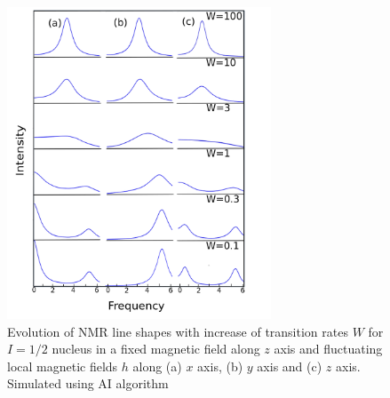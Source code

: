 \begin{figure}[h!]
\centering
\includegraphics[width=0.7\textwidth]{figures/chap2/blumediag.png}
\caption{Evolution of NMR line shapes with increase of transition rates $W$ for $I=1/2$ nucleus in a fixed magnetic field along $z$ axis and fluctuating local magnetic fields $h$ along (a) $x$ axis, (b) $y$ axis and (c) $z$ axis. Simulated using AI algorithm}
\label{figure:blumediag}
\end{figure}
\clearpage
